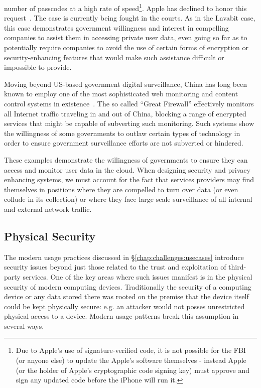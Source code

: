 \begin{packed_desc}
  number of passcodes at a high rate of speed\footnote{Due to Apple's
    use of signature-verified code, it is not possible for the FBI (or
    anyone else) to update the Apple's software themselves - instead
    Apple (or the holder of Apple's cryptographic code signing key)
    must approve and sign any updated code before the iPhone will run
    it.}\cite{eff-applecrypto}. Apple has declined to honor this
  request~\cite{apple-fbiletter}. The case is currently being fought
  in the courts. As in the Lavabit case, this case demonstrates
  government willingness and interest in compelling companies to
  assist them in accessing private user data, even going so far as to
  potentially require companies to avoid the use of certain forms of
  encryption or security-enhancing features that would make such
  assistance difficult or impossible to provide.
\item[The Great Firewall:] Moving beyond US-based government digital
  surveillance, China has long been known to employ one of the most
  sophisticated web monitoring and content control systems in
  existence~\cite{rsf-china}. The so called ``Great Firewall''
  effectively monitors all Internet traffic traveling in and out of
  China, blocking a range of encrypted services that might be capable
  of subverting such monitoring. Such systems show the willingness of
  some governments to outlaw certain types of technology in order to
  ensure government surveillance efforts are not subverted or
  hindered.
\end{packed_desc}

These examples demonstrate the willingness of governments to ensure
they can access and monitor user data in the cloud. When designing
security and privacy enhancing systems, we must account for the fact
that services providers may find themselves in positions where they
are compelled to turn over data (or even collude in its collection) or
where they face large scale surveillance of all internal and external
network traffic.

\subsection{Physical Security}

The modern usage practices discussed in
\S\ref{chap:challenges:usecases} introduce security issues beyond just
those related to the trust and exploitation of third-party
services. One of the key areas where such issues manifest is in the
physical security of modern computing devices. Traditionally the
security of a computing device or any data stored there was rooted on
the premise that the device itself could be kept physically secure:
e.g. an attacker would not posses unrestricted physical access to a
device. Modern usage patterns break this assumption in several ways.

